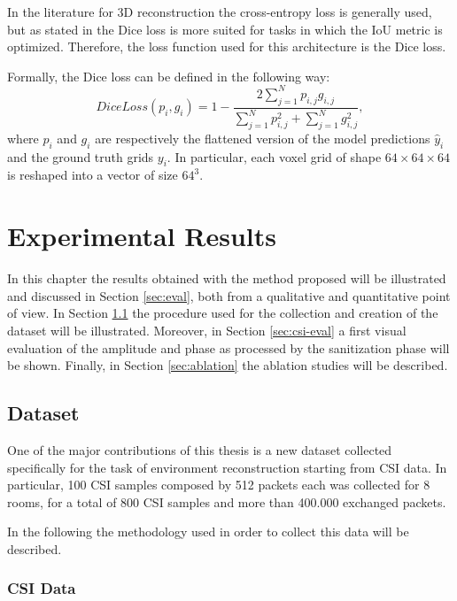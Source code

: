 \documentclass[binding=0.6cm,noexaminfo]{sapthesis}
\begin{document}
In the literature for 3D reconstruction the cross-entropy loss is generally used, but as stated in \cite{3d-retr} the Dice loss is more suited for tasks in which the IoU metric is optimized. Therefore, the loss function used for this architecture is the Dice loss.

Formally, the Dice loss can be defined in the following way:
\begin{equation}
DiceLoss(p_i, g_i) = 1 - \frac{2 \sum_{j=1}^N p_{i,j} g_{i,j}}{\sum_{j=1}^N p_{i,j}^2 + \sum_{j=1}^N g_{i,j}^2},
\end{equation}
where $p_i$ and $g_i$ are respectively the flattened version of the model predictions $\hat{y}_i$ and the ground truth grids $y_i$. In particular, each voxel grid of shape $64 \times 64 \times 64$ is reshaped into a vector of size $64^3$.


\chapter{Experimental Results}\label{cap:results}

In this chapter the results obtained with the method proposed will be illustrated and discussed in Section \ref{sec:eval}, both from a qualitative and quantitative point of view. In Section \ref{sec:dataset} the procedure used for the collection and creation of the dataset will be illustrated. Moreover, in Section \ref{sec:csi-eval} a first visual evaluation of the amplitude and phase as processed by the sanitization phase will be shown. Finally, in Section \ref{sec:ablation} the ablation studies will be described.

\section{Dataset}\label{sec:dataset}

One of the major contributions of this thesis is a new dataset collected specifically for the task of environment reconstruction starting from CSI data. In particular, 100 CSI samples composed by 512 packets each was collected for 8 rooms, for a total of 800 CSI samples and more than 400.000 exchanged packets.

In the following the methodology used in order to collect this data will be described.

\subsection{CSI Data}
\end{document}
